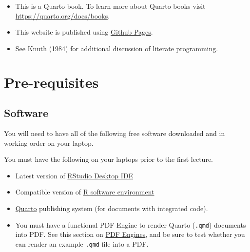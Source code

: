 \documentclass[
  letterpaper,
  DIV=11,
  numbers=noendperiod]{scrreprt}
\providecommand{\tightlist}{%
  \setlength{\itemsep}{0pt}\setlength{\parskip}{0pt}}\usepackage{longtable,booktabs,array}
\begin{document}

\begin{itemize}
\tightlist
\item
  This is a Quarto book. To learn more about Quarto books visit
  \url{https://quarto.org/docs/books}.
\item
  This website is published using
  \href{https://pages.github.com/}{Github Pages}.
\item
  See Knuth (1984) for additional discussion of literate programming.
\end{itemize}

\part{Pre-requisites}

\hypertarget{software}{%
\chapter{Software}\label{software}}

You will need to have all of the following free software downloaded and
in working order on your laptop.

\begin{tcolorbox}[enhanced jigsaw, colback=white, title=\textcolor{quarto-callout-important-color}{\faExclamation}\hspace{0.5em}{Prior to first lecture}, left=2mm, coltitle=black, bottomrule=.15mm, arc=.35mm, toprule=.15mm, rightrule=.15mm, opacityback=0, opacitybacktitle=0.6, colframe=quarto-callout-important-color-frame, leftrule=.75mm, toptitle=1mm, titlerule=0mm, breakable, bottomtitle=1mm, colbacktitle=quarto-callout-important-color!10!white]

You must have the following on your laptops prior to the first lecture.

\end{tcolorbox}

\begin{itemize}
\tightlist
\item
  Latest version of \href{https://posit.co/downloads/}{RStudio Desktop
  IDE}
\item
  Compatible version of \href{https://ftp.osuosl.org/pub/cran/}{R
  software environment}
\item
  \href{https://quarto.org/docs/get-started/}{Quarto} publishing system
  (for documents with integrated code).
\item
  You must have a functional PDF Engine to render Quarto (\texttt{.qmd})
  documents into PDF. See this section on
  \href{https://quarto.org/docs/output-formats/pdf-engine.html}{PDF
  Engines}, and be sure to test whether you can render an example
  \texttt{.qmd} file into a PDF.
\end{itemize}
\end{document}
